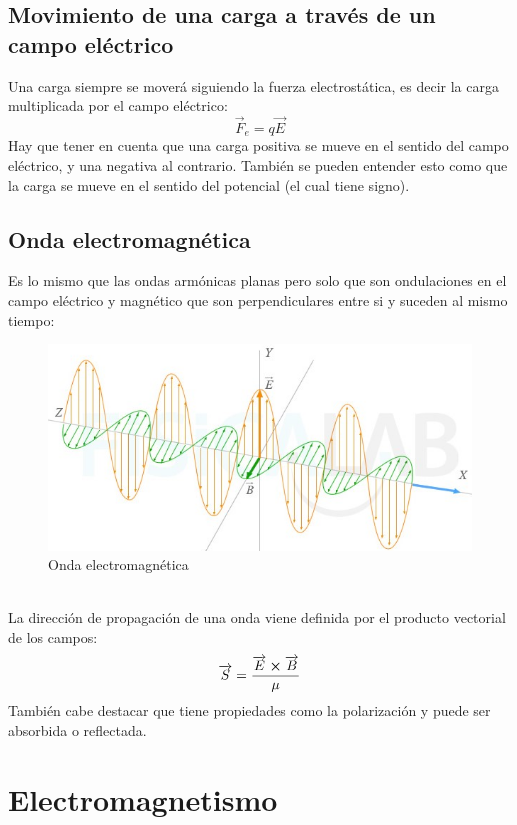 \documentclass[arial,a4paper,print]{article}
\begin{document}
\subsection{Movimiento de una carga a través de un campo eléctrico}
Una carga siempre se moverá siguiendo la fuerza electrostática, es decir la carga multiplicada por el campo eléctrico:
\begin{equation*}
	\overrightarrow{F}_{e} = q\overrightarrow{E}
\end{equation*}
Hay que tener en cuenta que una carga positiva se mueve en el sentido del campo eléctrico, y una negativa al contrario. También se pueden entender esto como que la carga se mueve en el sentido del potencial (el cual tiene signo). 

\subsection{Onda electromagnética}
Es lo mismo que las ondas armónicas planas pero solo que son ondulaciones en el campo eléctrico y magnético que son perpendiculares entre si y suceden al mismo tiempo:
\begin{figure}[h]
	\centering
	\includegraphics[width=0.4\linewidth]{sintesis-electromagnetica}
	\caption{Onda electromagnética}
	\label{fig:sintesis-electromagnetica}
\end{figure}
\\
La dirección de propagación de una onda viene definida por el producto vectorial de los campos:
\begin{equation*}
	\overrightarrow{S} = \frac{\overrightarrow{E}\cross\overrightarrow{B}}{\mu}
\end{equation*}
También cabe destacar que tiene propiedades como la polarización y puede ser absorbida o reflectada. 


\section{Electromagnetismo}
\end{document}
